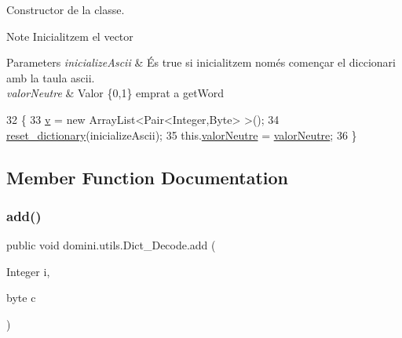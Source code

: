 Constructor de la classe. 

\begin{DoxyNote}{Note}
Inicialitzem el vector 
\end{DoxyNote}

\begin{DoxyParams}{Parameters}
{\em inicialize\+Ascii} & És true si inicialitzem només començar el diccionari amb la taula ascii. \\
\hline
{\em valor\+Neutre} & Valor \{0,1\} emprat a get\+Word \\
\hline
\end{DoxyParams}

\begin{DoxyCode}
32                                                                      \{
33         \hyperlink{classdomini_1_1utils_1_1Dict__Decode_a351bb8836b391e5e21ebc9cc1943a22d}{v} = \textcolor{keyword}{new} ArrayList<Pair<Integer,Byte> >();
34         \hyperlink{classdomini_1_1utils_1_1Dict__Decode_a635432505df1ceaa58a987bb80c6b0a3}{reset\_dictionary}(inicializeAscii);
35         this.\hyperlink{classdomini_1_1utils_1_1Dict__Decode_a6ef2d17f449cf7a658a4bf983e2fb474}{valorNeutre} = \hyperlink{classdomini_1_1utils_1_1Dict__Decode_a6ef2d17f449cf7a658a4bf983e2fb474}{valorNeutre};
36     \}
\end{DoxyCode}


\subsection{Member Function Documentation}
\mbox{\label{classdomini_1_1utils_1_1Dict__Decode_a077011e4507db308d143ea9b7146abb9}} 
\subsubsection{\texorpdfstring{add()}{add()}}
{\footnotesize\ttfamily public void domini.\+utils.\+Dict\+\_\+\+Decode.\+add (\begin{DoxyParamCaption}\item[{Integer}]{i,  }\item[{byte}]{c }\end{DoxyParamCaption})\hspace{0.3cm}{\ttfamily [inline]}}



